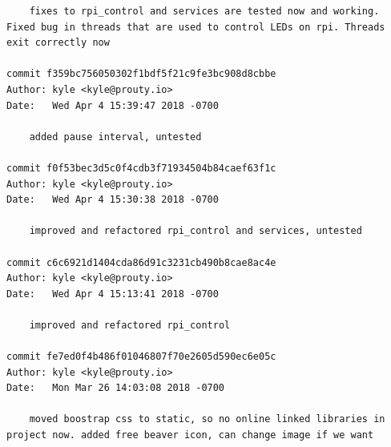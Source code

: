 \documentclass[draftclsnofoot, onecolumn, compsoc, 10pt]{IEEEtran}
\begin{document}
\begin{lstlisting}
    fixes to rpi_control and services are tested now and working. Fixed bug in threads that are used to control LEDs on rpi. Threads exit correctly now 

commit f359bc756050302f1bdf5f21c9fe3bc908d8cbbe 
Author: kyle <kyle@prouty.io> 
Date:   Wed Apr 4 15:39:47 2018 -0700 

    added pause interval, untested 

commit f0f53bec3d5c0f4cdb3f71934504b84caef63f1c 
Author: kyle <kyle@prouty.io> 
Date:   Wed Apr 4 15:30:38 2018 -0700 

    improved and refactored rpi_control and services, untested 

commit c6c6921d1404cda86d91c3231cb490b8cae8ac4e 
Author: kyle <kyle@prouty.io> 
Date:   Wed Apr 4 15:13:41 2018 -0700 

    improved and refactored rpi_control 

commit fe7ed0f4b486f01046807f70e2605d590ec6e05c 
Author: kyle <kyle@prouty.io> 
Date:   Mon Mar 26 14:03:08 2018 -0700 

    moved boostrap css to static, so no online linked libraries in project now. added free beaver icon, can change image if we want 
\end{lstlisting}
\end{document}
